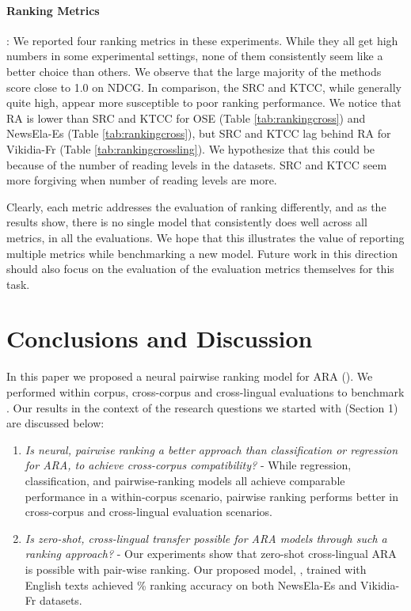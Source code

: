 \documentclass[11pt]{article}
\begin{document}
\paragraph{Ranking Metrics}: We reported four ranking metrics in these experiments. While they all get high numbers in some experimental settings, none of them consistently seem like a better choice than others. We observe that the large majority of the methods score close to 1.0 on NDCG. In comparison, the SRC and KTCC, while generally quite high, appear more susceptible to poor ranking performance. We notice that RA is lower than SRC and KTCC for OSE (Table \ref{tab:rankingcross}) and NewsEla-Es (Table \ref{tab:rankingcross}), but SRC and KTCC lag behind RA for Vikidia-Fr (Table \ref{tab:rankingcrossling}). We hypothesize that this could be because of the number of reading levels in the datasets. SRC and KTCC seem more forgiving when number of reading levels are more. 

Clearly, each metric addresses the evaluation of ranking differently, and as the results show, there is no single model that consistently does well across all metrics, in all the evaluations. We hope that this illustrates the value of reporting multiple metrics while benchmarking a new model. Future work in this direction should also focus on the evaluation of the evaluation metrics themselves for this task.

\section{Conclusions and Discussion}
\label{sec:disc}
In this paper we proposed a neural pairwise ranking model for ARA (). We performed within corpus, cross-corpus and cross-lingual evaluations to benchmark . Our results in the context of the research questions we started with (Section 1) are discussed below:
\begin{enumerate}
 \item \textit{Is neural, pairwise ranking a better approach than classification or regression for ARA, to achieve cross-corpus compatibility?} - While regression, classification, and pairwise-ranking models all achieve comparable performance in a within-corpus scenario, pairwise ranking performs better in cross-corpus and cross-lingual evaluation scenarios.  
 
    \item \textit{Is zero-shot, cross-lingual transfer possible for ARA models through such a ranking approach?} - Our experiments show that zero-shot cross-lingual ARA is possible with pair-wise ranking. Our proposed model, , trained with English texts achieved \% ranking accuracy on both NewsEla-Es and Vikidia-Fr datasets. 
\end{enumerate}
\end{document}
